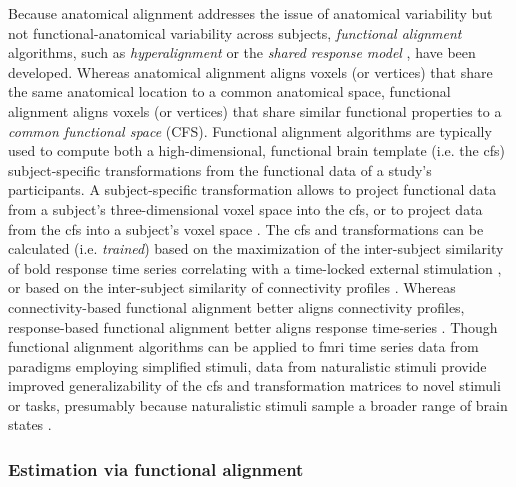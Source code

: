 %
Because anatomical alignment addresses the issue of anatomical variability but
not functional-anatomical variability across subjects, \textit{functional
alignment} algorithms, such as \textit{hyperalignment} \citep{haxby2011common,
guntupalli2016model} or the \textit{shared response model}
\citep{chen2015reduced, zhang2016searchlight}, have been developed.
%
Whereas anatomical alignment aligns voxels (or vertices) that share the same
anatomical location to a common anatomical space, functional alignment aligns
voxels (or vertices) that share similar functional properties to a
\textit{common functional space} (CFS).
%
Functional alignment algorithms are typically used to compute both a
high-dimensional, functional brain template (i.e. the \ac{cfs}) subject-specific
transformations from the functional data of a study's participants.
%
A subject-specific transformation allows to project functional data from a
subject's three-dimensional voxel space into the \ac{cfs}, or to project data
from the \ac{cfs} into a subject's voxel space \citep{haxby2020hyperalignment,
kumar2020brainiak}.
%
The \ac{cfs} and transformations can be calculated (i.e. \textit{trained}) based
on the maximization of the inter-subject similarity of \ac{bold} response time
series correlating with a time-locked external stimulation
\citep{haxby2011common, chen2015reduced, sabuncu2010function}, or based on the
inter-subject similarity of connectivity profiles \citep{feilong2018reliable,
guntupalli2018computational, nastase2019leveraging}.
%
Whereas connectivity-based functional alignment better aligns connectivity
profiles, response-based functional alignment better aligns response time-series
\citep{guntupalli2018computational}.
%
Though functional alignment algorithms can be applied to \ac{fmri} time series
data from paradigms employing simplified stimuli, data from naturalistic stimuli
provide
%
improved generalizability of the \ac{cfs}
%
and transformation matrices
%
to novel stimuli or tasks, presumably because naturalistic stimuli sample a
broader range of brain states \citep{haxby2011common, guntupalli2016model}.


\subsubsection{Estimation via functional alignment}



